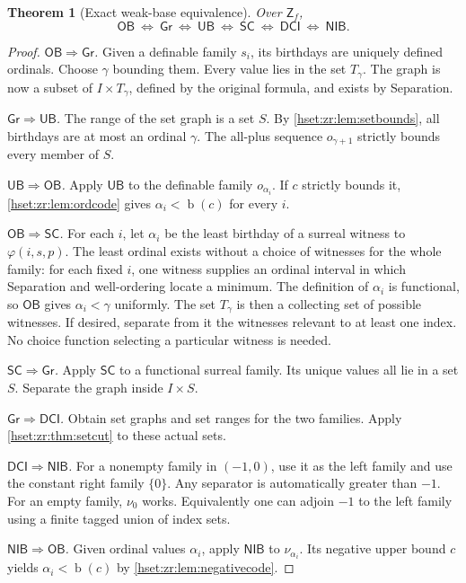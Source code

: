 \documentclass[11pt,letterpaper]{article}
\newtheorem{theorem}{Theorem}[section]
\theoremstyle{definition}
\theoremstyle{remark}
\newcommand{\bd}{\operatorname{b}}
\newcommand{\Zf}{\mathsf{Z}_{\!f}}
\newcommand{\OB}{\mathsf{OB}}
\newcommand{\Gr}{\mathsf{Gr}}
\newcommand{\UB}{\mathsf{UB}}
\newcommand{\SC}{\mathsf{SC}}
\newcommand{\DCI}{\mathsf{DCI}}
\newcommand{\NIB}{\mathsf{NIB}}
\begin{document}
\begin{theorem}[Exact weak-base equivalence]
\label{hset:zr:thm:equivalence}
Over $\Zf$,
\[
\boxed{\quad
\OB\ \Longleftrightarrow\ \Gr\ \Longleftrightarrow\ \UB
\ \Longleftrightarrow\ \SC\ \Longleftrightarrow\ \DCI
\ \Longleftrightarrow\ \NIB.\quad}
\]
\end{theorem}
\begin{proof}
\emph{$\OB\Rightarrow\Gr$.} Given a definable family $s_i$, its birthdays are uniquely defined ordinals. Choose $\gamma$ bounding them. Every value lies in the set $T_\gamma$. The graph is now a subset of $I\times T_\gamma$, defined by the original formula, and exists by Separation.

\emph{$\Gr\Rightarrow\UB$.} The range of the set graph is a set $S$. By \cref{hset:zr:lem:setbounds}, all birthdays are at most an ordinal $\gamma$. The all-plus sequence $o_{\gamma+1}$ strictly bounds every member of $S$.

\emph{$\UB\Rightarrow\OB$.} Apply $\UB$ to the definable family $o_{\alpha_i}$. If $c$ strictly bounds it, \cref{hset:zr:lem:ordcode} gives $\alpha_i<\bd(c)$ for every $i$.

\emph{$\OB\Rightarrow\SC$.} For each $i$, let $\alpha_i$ be the least birthday of a surreal witness to $\varphi(i,s,p)$. The least ordinal exists without a choice of witnesses for the whole family: for each fixed $i$, one witness supplies an ordinal interval in which Separation and well-ordering locate a minimum. The definition of $\alpha_i$ is functional, so $\OB$ gives $\alpha_i<\gamma$ uniformly. The set $T_\gamma$ is then a collecting set of possible witnesses. If desired, separate from it the witnesses relevant to at least one index. No choice function selecting a particular witness is needed.

\emph{$\SC\Rightarrow\Gr$.} Apply $\SC$ to a functional surreal family. Its unique values all lie in a set $S$. Separate the graph inside $I\times S$.

\emph{$\Gr\Rightarrow\DCI$.} Obtain set graphs and set ranges for the two families. Apply \cref{hset:zr:thm:setcut} to these actual sets.

\emph{$\DCI\Rightarrow\NIB$.} For a nonempty family in $(-1,0)$, use it as the left family and use the constant right family $\{0\}$. Any separator is automatically greater than $-1$. For an empty family, $\nu_0$ works. Equivalently one can adjoin $-1$ to the left family using a finite tagged union of index sets.

\emph{$\NIB\Rightarrow\OB$.} Given ordinal values $\alpha_i$, apply $\NIB$ to $\nu_{\alpha_i}$. Its negative upper bound $c$ yields $\alpha_i<\bd(c)$ by \cref{hset:zr:lem:negativecode}.
\end{proof}
\end{document}
